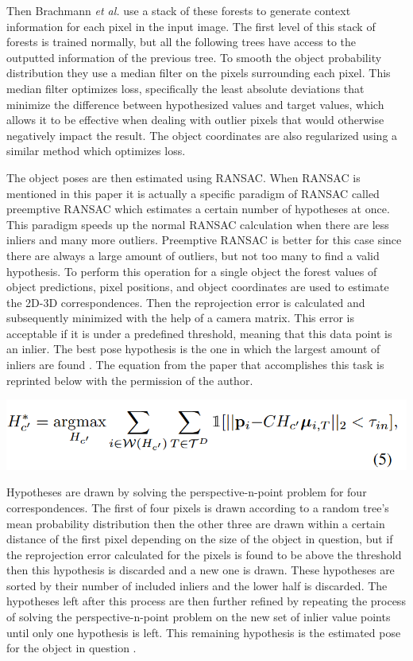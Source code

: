 \documentclass[12pt]{article}
\let\origfigure=\figure
\let\endorigfigure=\endfigure
\renewenvironment{figure}[1][]{%
  \origfigure[H]
}{%
  \endorigfigure
}
\begin{document}
Then Brachmann \emph{et al.} use a stack of these forests to generate
context information for each pixel in the input image. The first level
of this stack of forests is trained normally, but all the following
trees have access to the outputted information of the previous tree. To
smooth the object probability distribution they use a median filter on
the pixels surrounding each pixel. This median filter optimizes loss,
specifically the least absolute deviations that minimize the difference
between hypothesized values and target values, which allows it to be
effective when dealing with outlier pixels that would otherwise
negatively impact the result. The object coordinates are also
regularized using a similar method which optimizes
loss\autocite{brachmann}.

The object poses are then estimated using RANSAC. When RANSAC is
mentioned in this paper it is actually a specific paradigm of RANSAC
called preemptive RANSAC which estimates a certain number of hypotheses
at once. This paradigm speeds up the normal RANSAC calculation when
there are less inliers and many more outliers. Preemptive RANSAC is
better for this case since there are always a large amount of outliers,
but not too many to find a valid hypothesis. To perform this operation
for a single object the forest values of object predictions, pixel
positions, and object coordinates are used to estimate the 2D-3D
correspondences. Then the reprojection error is calculated and
subsequently minimized with the help of a camera matrix. This error is
acceptable if it is under a predefined threshold, meaning that this data
point is an inlier. The best pose hypothesis is the one in which the
largest amount of inliers are found \autocite{brachmann}. The equation
from the paper that accomplishes this task is reprinted below with the
permission of the author.

\begin{figure}
\centering
\includegraphics{Pictures/eq5.png}
\caption{The RANSAC formula to maximize inlier count of a given pose}
\end{figure}

Hypotheses are drawn by solving the perspective-n-point problem for four
correspondences. The first of four pixels is drawn according to a random
tree's mean probability distribution then the other three are drawn
within a certain distance of the first pixel depending on the size of
the object in question, but if the reprojection error calculated for the
pixels is found to be above the threshold then this hypothesis is
discarded and a new one is drawn. These hypotheses are sorted by their
number of included inliers and the lower half is discarded. The
hypotheses left after this process are then further refined by repeating
the process of solving the perspective-n-point problem on the new set of
inlier value points until only one hypothesis is left. This remaining
hypothesis is the estimated pose for the object in question
\autocite{brachmann}.
\end{document}
